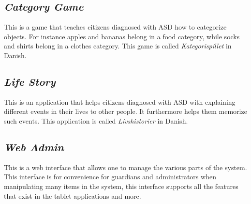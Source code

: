 \subsection*{\emph{Category Game}}
\label{sec:app_category_game}
This is a game that teaches citizens diagnosed with ASD how to categorize objects. For instance apples and bananas belong in a food category, while socks and shirts belong in a clothes category. This game is called \emph{Kategorispillet} in Danish.

\subsection*{\emph{Life Story}}
\label{sec:app_life_story}
This is an application that helps citizens diagnosed with ASD with explaining different events in their lives to other people. It furthermore helps them memorize such events. This application is called \emph{Livshistorier} in Danish.

\subsection*{\emph{Web Admin}}
\label{sec:app_web_admin}
This is a web interface that allows one to manage the various parts of the \giraf system. This interface is for convenience for guardians and administrators when manipulating many items in the system, this interface supports all the features that exist in the tablet applications and more.